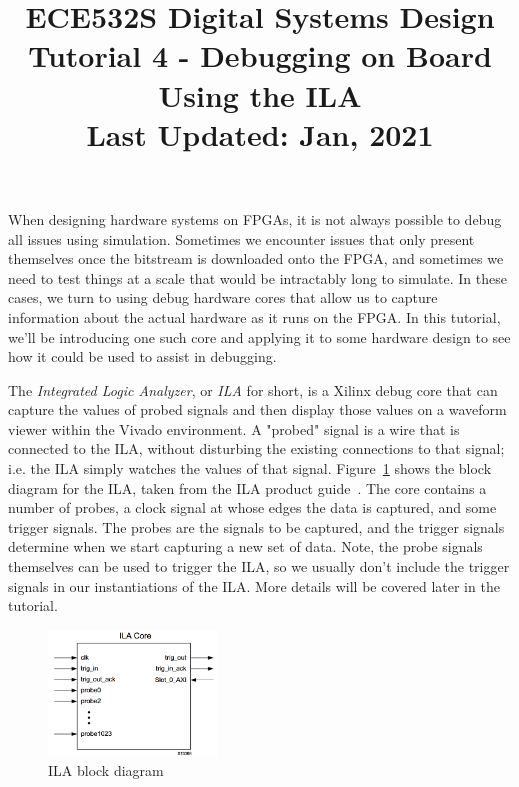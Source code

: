 \documentclass[11pt]{article}
\title{ECE532S Digital Systems Design \\ \vspace{0.4cm}
       \Large Tutorial 4 - Debugging on Board Using the ILA \\ \vspace{0.4cm}
       \small Last Updated: Jan, 2021}
\author{ }
\date{ }
\begin{document}
\maketitle
\vspace{-1cm}

When designing hardware systems on FPGAs, it is not always possible to debug all issues using simulation. Sometimes we encounter issues that only present themselves once the bitstream is downloaded onto the FPGA, and sometimes we need to test things at a scale that would be intractably long to simulate. In these cases, we turn to using debug hardware cores that allow us to capture information about the actual hardware as it runs on the FPGA. In this tutorial, we'll be introducing one such core and applying it to some hardware design to see how it could be used to assist in debugging.

The \textit{Integrated Logic Analyzer}, or \textit{ILA} for short, is a Xilinx debug core that can capture the values of probed signals and then display those values on a waveform viewer within the Vivado environment. A "probed" signal is a wire that is connected to the ILA, without disturbing the existing connections to that signal; i.e. the ILA simply watches the values of that signal. Figure~\ref{fig:ila} shows the block diagram for the ILA, taken from the ILA product guide~\cite{xilinx_ila}. The core contains a number of probes, a clock signal at whose edges the data is captured, and some trigger signals. The probes are the signals to be captured, and the trigger signals determine when we start capturing a new set of data. Note, the probe signals themselves can be used to trigger the ILA, so we usually don't include the trigger signals in our instantiations of the ILA. More details will be covered later in the tutorial.


\begin{figure}[!h]
    \centering
    \includegraphics[width=0.4\textwidth]{images/ila.png}
    \caption{ILA block diagram}
    \label{fig:ila}
\end{figure}
\end{document}
